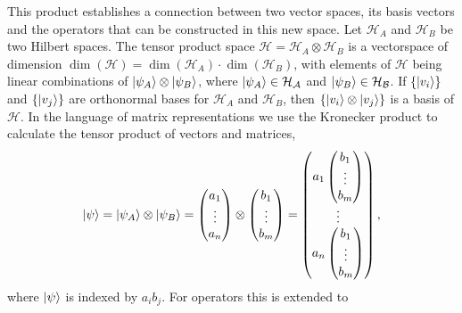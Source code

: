 \noindent This product establishes a connection between two vector spaces, its basis vectors and the operators that can be constructed in this new space. Let $\mathcal{H}_A$ and $\mathcal{H}_B$ be two Hilbert spaces. The tensor product space $\mathcal{H} = \mathcal{H}_A\otimes \mathcal{H}_B$ is a vectorspace of dimension $\dim(\mathcal{H}) = \dim(\mathcal{H}_A)\cdot \dim(\mathcal{H}_B)$, with elements of $\mathcal{H}$ being linear combinations of $\ket{\psi_A}\otimes\ket{\psi_B}$, where $\ket{\psi_A}\in\mathcal{H_A}$ and $\ket{\psi_B} \in \mathcal{H_B}$. 
If $\{\ket{v_i}\}$ and $\{\ket{v_j}\}$ are orthonormal bases for $\mathcal{H}_A$ and $\mathcal{H}_B$, then $\{\ket{v_i} \otimes \ket{v_j}\}$ is a basis of $\mathcal{H}$. In the language of matrix representations we use the Kronecker product to calculate the tensor product of vectors and matrices,
\begin{equation*}
    \ket{\psi} = \ket{\psi_A}\otimes\ket{\psi_B} = 
    \begin{pmatrix}
        a_1 \\
        \vdots\\
        a_n
    \end{pmatrix}
    \otimes
    \begin{pmatrix}
        b_1 \\
        \vdots\\
        b_m
    \end{pmatrix}
    =
    \begin{pmatrix}
    a_1 \begin{pmatrix}
        b_1 \\
        \vdots\\
        b_m
    \end{pmatrix}\\
    \vdots\\
    a_n \begin{pmatrix}
        b_1 \\
        \vdots\\
        b_m
    \end{pmatrix}
    \end{pmatrix},
\end{equation*}
where $\ket{\psi}$ is indexed by $a_i b_j$. For operators this is extended to
